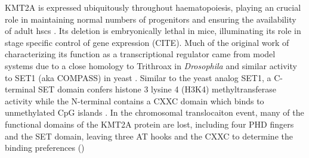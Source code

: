 



%
KMT2A is expressed ubiquitously throughout haematopoiesis, playing an crucial role in maintaining normal numbers of progenitors and ensuring the availability of adult \glspl{hsc} \cite{Meyer2017, Antunes2020, Ernst2004} . Its deletion is embryonically lethal in mice, illuminating its role in stage specific control of gene expression (CITE). Much of the original work of characterizing its function as a transcriptional regulator came from model systems due to a close homology to Trithroax in \textit{Drosophila} and similar activity to SET1 (aka COMPASS) in yeast \cite{Popovic2005}. 
Similar to the yeast analog SET1, a C-terminal SET domain confers histone 3 lysine 4 (H3K4) methyltransferase activity while the N-terminal contains a CXXC domain which binds to unmethylated CpG islands \cite{JJ2003, Hsieh2003, Cierpicki2010,Ayton2004,LE2013}. In the chromosomal translocaiton event, many of the functional domains of the KMT2A protein are lost, including four PHD fingers and the SET domain, leaving three AT hooks and the CXXC to determine the binding preferences ()


